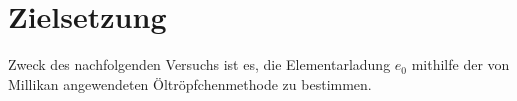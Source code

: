 \section{Zielsetzung}
\label{sec:zielsetzung}

Zweck des nachfolgenden Versuchs ist es, die Elementarladung $e_0$ mithilfe der von Millikan angewendeten Öltröpfchenmethode zu bestimmen.
